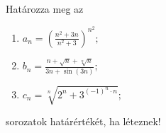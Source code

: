 \documentclass[11pt]{scrartcl}
\begin{document}
Határozza meg az
\begin{enumerate}
	\item \(\displaystyle
	      a_n = \left(
	      \frac{n^2 + 3n}{n^2 + 3}
	      \right)^{n^2};
	      \)

	\item \(\displaystyle
	      b_n = \frac{n + \sqrt{n} + \sqrt[n]{n}}{3n + \sin(3n)};
	      \)

	\item \(\displaystyle
	      c_n = \sqrt[n]{2^n + 3^{(-1)^n \cdot n}};
	      \)
\end{enumerate}
sorozatok határértékét, ha léteznek!
\end{document}
